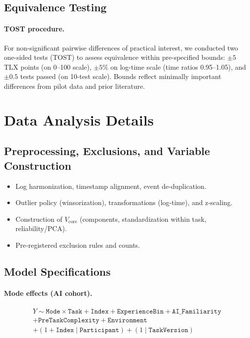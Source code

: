 \documentclass[sigconf]{acmart}
\begin{document}
\subsection{Equivalence Testing}

\paragraph{TOST procedure.}
For non-significant pairwise differences of practical interest, we conducted two one-sided tests (TOST) to assess equivalence within pre-specified bounds: \(\pm 5\) TLX points (on 0--100 scale), \(\pm 5\%\) on log-time scale (time ratios 0.95--1.05), and \(\pm 0.5\) tests passed (on 10-test scale). Bounds reflect minimally important differences from pilot data and prior literature.

\section{Data Analysis Details}
\label{app:analysis-details}

\subsection{Preprocessing, Exclusions, and Variable Construction}
\label{app:prep}
\begin{itemize}[leftmargin=1.25em]
  \item Log harmonization, timestamp alignment, event de‑duplication.
  \item Outlier policy (winsorization), transformations (log‑time), and z‑scaling.
  \item Construction of $V_{\text{core}}$ (components, standardization within task, reliability/PCA).
  \item Pre‑registered exclusion rules and counts.
\end{itemize}

\subsection{Model Specifications}
\label{app:models}
\paragraph{Mode effects (AI cohort).}
\[
\begin{aligned}
Y \sim \texttt{Mode} \times \texttt{Task} + \texttt{Index} + \texttt{ExperienceBin} + \texttt{AI\_Familiarity} \\ + \texttt{PreTaskComplexity} + \texttt{Environment} \qquad\qquad\qquad\qquad\quad \\ + (1 + \texttt{Index} \mid \texttt{Participant}) + (1 \mid \texttt{TaskVersion}) \qquad\qquad
\end{aligned}
\]
\end{document}
